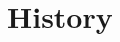 \documentclass[12pt]{article}
\begin{document}
	\section{History}
	
	
	
	
	
	
	
	
	
	
\end{document}
